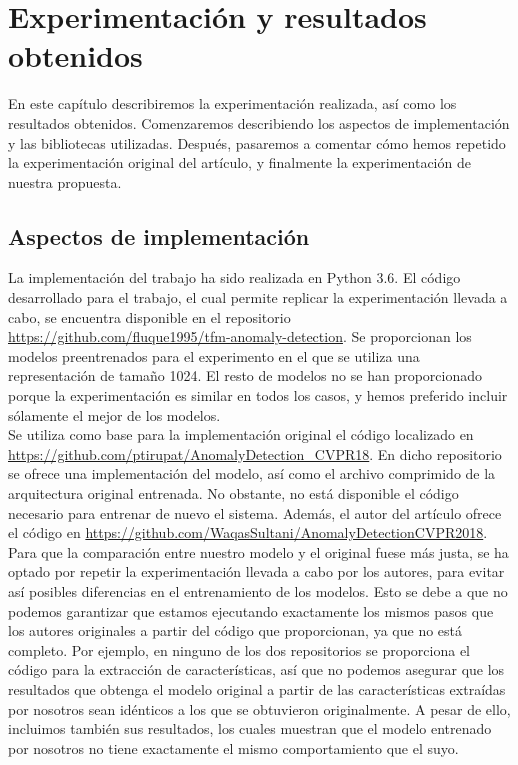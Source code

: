 \documentclass[../main.tex]{memoir}
\begin{document}
\chapter{Experimentación y resultados obtenidos}
\label{sec:experiments-and-results}

En este capítulo describiremos la experimentación realizada, así como
los resultados obtenidos. Comenzaremos describiendo los aspectos de
implementación y las bibliotecas utilizadas. Después, pasaremos a
comentar cómo hemos repetido la experimentación original del artículo,
y finalmente la experimentación de nuestra propuesta.

\section{Aspectos de implementación}

La implementación del trabajo ha sido realizada en Python 3.6. El
código desarrollado para el trabajo, el cual permite replicar la
experimentación llevada a cabo, se encuentra disponible en el
repositorio \url{https://github.com/fluque1995/tfm-anomaly-detection}.
Se proporcionan los modelos preentrenados para el experimento en el
que se utiliza una representación de tamaño 1024. El resto de
modelos no se han proporcionado porque la experimentación es similar
en todos los casos, y hemos preferido incluir sólamente el mejor
de los modelos.\\

Se utiliza como base para la implementación original el código
localizado en
\url{https://github.com/ptirupat/AnomalyDetection_CVPR18}. En dicho
repositorio se ofrece una implementación del modelo, así como el
archivo comprimido de la arquitectura original entrenada. No obstante,
no está disponible el código necesario para entrenar de nuevo el
sistema. Además, el autor del artículo ofrece el código en
\url{https://github.com/WaqasSultani/AnomalyDetectionCVPR2018}.\\

Para que la comparación entre nuestro modelo y el original fuese más
justa, se ha optado por repetir la experimentación llevada a cabo por
los autores, para evitar así posibles diferencias en el entrenamiento
de los modelos. Esto se debe a que no podemos garantizar que estamos
ejecutando exactamente los mismos pasos que los autores originales a
partir del código que proporcionan, ya que no está completo. Por
ejemplo, en ninguno de los dos repositorios se proporciona el código
para la extracción de características, así que no podemos asegurar que
los resultados que obtenga el modelo original a partir de las
características extraídas por nosotros sean idénticos a los que se
obtuvieron originalmente. A pesar de ello, incluimos también sus
resultados, los cuales muestran que el modelo entrenado por nosotros
no tiene exactamente el mismo comportamiento que el suyo.\\
\end{document}
